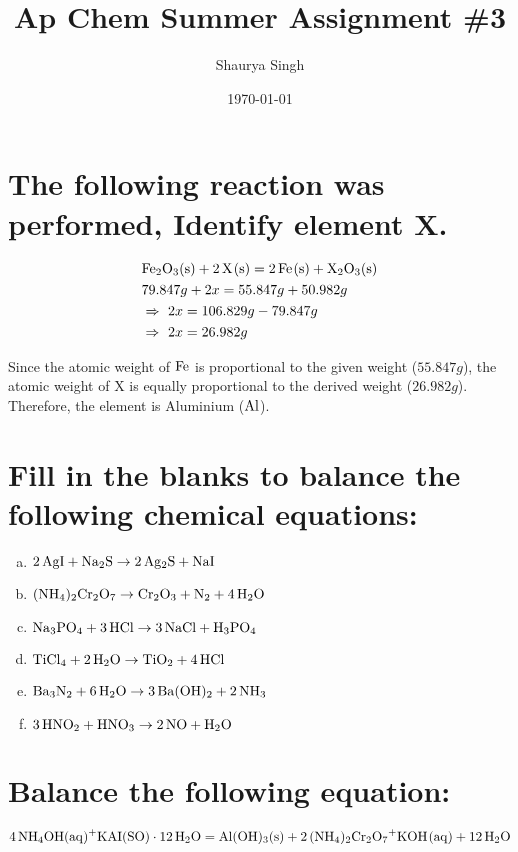 \documentclass{scrartcl}
\author{Shaurya Singh}
\date{\today}
\title{Ap Chem Summer Assignment \#3}
\begin{document}
\maketitle


\section{The following reaction was performed, Identify element X.}
\label{sec:org47431d7}
\begin{align*}
  &\ce{Fe2O_3(s)}+\ce{2X(s)} = \ce{2Fe(s) + X_2O_3(s)}\\
  &79.847g+2x=55.847g+50.982g\\
  &\Rightarrow\ 2x=106.829g-79.847g\\
  &\Rightarrow\ 2x=26.982g\\
\end{align*}

Since the atomic weight of \(\ce{Fe}\) is proportional to the given weight
(\(55.847g\)), the atomic weight of X is equally proportional to the derived
weight (\(26.982g\)). Therefore, the element is Aluminium (\(\ce{Al}\)).

\section{Fill in the blanks to balance the following chemical equations:}
\label{sec:org8db1ab5}
\begin{enumerate}[a.]
\item \(\ce{2AgI + Na2S} \rightarrow \ce{2Ag2S + NaI}\)
\item \(\ce{(NH4)2Cr2O7} \rightarrow \ce{Cr2O3}+\ce{N2}+\ce{4H2O}\)
\item \(\ce{Na3PO4}+\ce{3HCl} \rightarrow \ce{3NaCl}+\ce{H3PO4}\)
\item \(\ce{TiCl4}+\ce{2H2O} \rightarrow \ce{TiO2}+\ce{4HCl}\)
\item \(\ce{Ba3N2}+\ce{6H2O} \rightarrow \ce{3Ba(OH)2}+\ce{2NH3}\)
\item \(\ce{3HNO2}+\ce{HNO3} \rightarrow \ce{2NO}+\ce{H2O}\)
\end{enumerate}

\section{Balance the following equation:}
\label{sec:org0bebcb0}
\(\ce{4NH4OH(aq)+KAI(SO)} \cdot \ce{12H2O} = \ce{Al(OH)3(s)} +
\ce{2(NH4)2Cr2O7+KOH(aq)}+\ce{12H2O}\)
\end{document}
